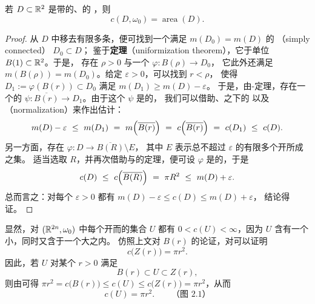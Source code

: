 \begin{proposition}\label{prop:area-capacity}
若 $D\subset\mathbb{R}^{2}$ 是带\trSmooth\trBoundary{}的\trCompact、\trConnected{}的%
\trDomain，则
\[
c(D,\omega_0)=\operatorname{area}(D).
\]
\end{proposition}

\begin{proof}
从 $D$ 中移去有限多条\trCompact\trCurve，便可找到一个满足 $m(D_0)=m(D)$ 的%
\textbf{\trSimplyConnected}（simply connected）\trDomain{} $D_0\subset D$；%
鉴于\textbf{\trUniformization{}定理}（uniformization theorem），它\trDiffeomorphic{}于单位\trDisc{} $B(1)\subset\mathbb{R}^{2}$。于是，%
存在 $\rho>0$ 与一个\trDiffeomorphism{} $\varphi:B(\rho)\to D_0$，%
它此外还满足 $m(B(\rho))=m(D_0)$。给定 $\varepsilon>0$，可以找到 $r<\rho$，%
使得 $D_1:=\varphi(B(r))\subset D_0$ 满足 $m(D_1)\geq m(D)-\varepsilon$。%
于是，由\trDacorogna-\trMoser{}定理，存在一个\trMeasurePreserving{}的%
\trDiffeomorphism{} $\psi:\overline{B(r)}\to D_1$。由于这个 $\psi$ 是\trSymplectic{}的，%
我们可以借助\trMonotonicity、\trSymplecticDiffeomorphism{}之下的\trInvariance{}%
以及\textbf{\trNormalization}（normalization）来作出估计：
\[
m(D)-\varepsilon\ \leq\ m(D_1)\ =\ m\Bigl(\overline{B(r)}\Bigr)\ =\ %
c\Bigl(\overline{B(r)}\Bigr)\ =\ c(D_1)\ \leq\ c(D).
\]
另一方面，存在\trDiffeomorphism{} $\varphi:D\to\overline{B(R)}\setminus E$，%
其中 $E$ 表示总\trMeasure{}不超过 $\varepsilon$ 的有限多个开\trDisc{}所成之集。%
适当选取 $R$，并再次借助\trDacorogna{}与\trMoser{}的定理，便可设 $\varphi$%
是\trSymplectic{}的，于是
\[
c(D)\ \leq\ c\Bigl(\overline{B(R)}\Bigr)\ =\ \pi R^{2}\ \leq\ m(D)+\varepsilon.
\]
总而言之：对每个 $\varepsilon>0$ 都有 $m(D)-\varepsilon\leq c(D)\leq m(D)+\varepsilon$，%
结论得证。
\end{proof}

显然，对 $(\mathbb{R}^{2n},\omega_0)$ 中每个开而\trBounded{}的集合 $U$ 都有%
$0<c(U)<\infty$，因为 $U$ 含有一个小\trBall，同时又含于一个大\trBall{}之内。%
仿照上文对 $B(r)$ 的论证，对\trSymplectic\trCylinder{}可以证明
\begin{equation}\label{eq:cylinder-capacity}
c\bigl(Z(r)\bigr)=\pi r^{2}.
\end{equation}
因此，若\trOpenSet{} $U$ 对某个 $r>0$ 满足
\[
B(r)\subset U\subset Z(r),
\]
则由\trMonotonicity{}可得 $\pi r^{2}=c\bigl(B(r)\bigr)\leq c(U)\leq%
c\bigl(Z(r)\bigr)=\pi r^{2}$，从而
\[
c(U)=\pi r^{2}.\qquad\text{（图 2.1）}
\]


